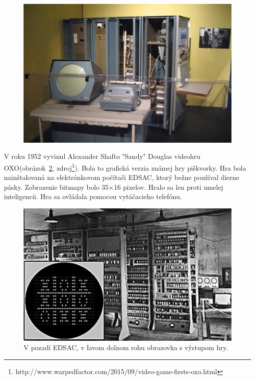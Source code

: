\documentclass[10pt,oneside,slovak,a4paper]{article}
\begin{document}
\begin{figure}[tbh]
\centering
\includegraphics[scale=0.2]{prva.jpg}
\caption{}
\label{prva}
\end{figure}



V roku 1952 vyvinul Alexander Shafto "Sandy" Douglas videohru OXO(obrázok~\ref{oxo}, zdroj\footnote{http://www.warpedfactor.com/2015/09/video-game-firsts-oxo.html}). Bola to grafická verzia známej hry piškvorky. Hra bola nainštalovaná na elektrónkovom počítači EDSAC, ktorý bežne používal dierne pásky. Zobrazenie bitmapy bolo 35×16 pixelov. Hralo sa len proti umelej inteligencii. Hra sa ovládala pomocou vytáčacieho telefónu.

\begin{figure}[tbh]
\centering
\includegraphics[scale=0.3]{oxo.jpg}
\caption{V pozadí EDSAC, v ľavom dolnom rohu obrazovka s výstupom hry.}
\label{oxo}
\end{figure}
\end{document}
